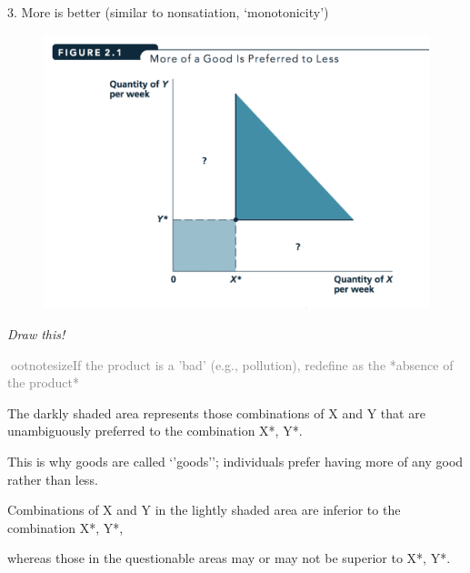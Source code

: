 \documentclass[table]{beamer}
\begin{document}
\begin{frame}

\begin{block}{3. More is better (similar to nonsatiation,
`monotonicity')}

\begin{figure}

{\centering \includegraphics[width=0.8\linewidth]{picsfigs/moreisbetter} 

}

\end{figure}

\medskip

\emph{Draw this!}

\textcolor{gray}{ootnotesize{If the product is a 'bad' (e.g., pollution), redefine as the *absence} of the product*}

The darkly shaded area represents those combinations of X and Y that are
unambiguously preferred to the combination X*, Y*.

This is why goods are called `'goods''; individuals prefer having more
of any good rather than less.

Combinations of X and Y in the lightly shaded area are inferior to the
combination X*, Y*,

whereas those in the questionable areas may or may not be superior to
X*, Y*.

\end{block}

\end{frame}
\end{document}
